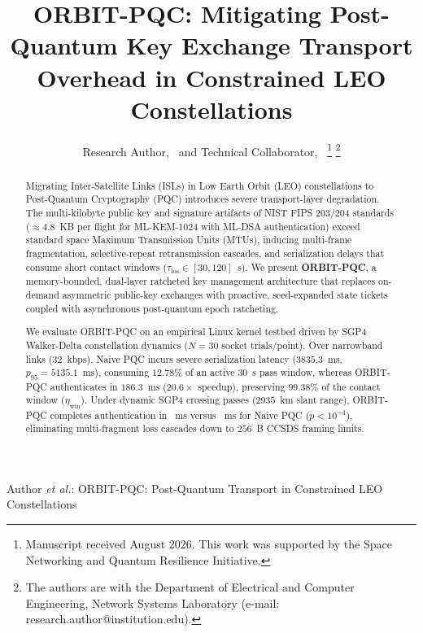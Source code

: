 \documentclass[lettersize,journal]{IEEEtran}
\begin{document}
\title{ORBIT-PQC: Mitigating Post-Quantum Key Exchange Transport Overhead in Constrained LEO Constellations}

\author{Research Author,~
        and Technical Collaborator,~%
\thanks{Manuscript received August 2026. This work was supported by the Space Networking and Quantum Resilience Initiative.}%
\thanks{The authors are with the Department of Electrical and Computer Engineering, Network Systems Laboratory (e-mail: research.author@institution.edu).}}

%
{Author \MakeLowercase{\textit{et al.}}: ORBIT-PQC: Post-Quantum Transport in Constrained LEO Constellations}

\maketitle

\begin{abstract}
Migrating Inter-Satellite Links (ISLs) in Low Earth Orbit (LEO) constellations to Post-Quantum Cryptography (PQC) introduces severe transport-layer degradation. The multi-kilobyte public key and signature artifacts of NIST FIPS 203/204 standards ($\approx 4.8$~KB per flight for ML-KEM-1024 with ML-DSA authentication) exceed standard space Maximum Transmission Units (MTUs), inducing multi-frame fragmentation, selective-repeat retransmission cascades, and serialization delays that consume short contact windows ($\tau_{\text{los}} \in [30, 120]$~s). We present \textbf{ORBIT-PQC}, a memory-bounded, dual-layer ratcheted key management architecture that replaces on-demand asymmetric public-key exchanges with proactive, seed-expanded state tickets coupled with asynchronous post-quantum epoch ratcheting.

We evaluate ORBIT-PQC on an empirical Linux kernel testbed driven by SGP4 Walker-Delta constellation dynamics ($N=30$ socket trials/point). Over narrowband links ($32$~kbps), Naive PQC incurs severe serialization latency ($3835.3$~ms, $p_{95} = 5135.1$~ms), consuming $12.78\%$ of an active $30$~s pass window, whereas ORBIT-PQC authenticates in $186.3$~ms ($20.6\times$ speedup), preserving $99.38\%$ of the contact window ($\eta_{\text{win}}$). Under dynamic SGP4 crossing passes ($2935$~km slant range), ORBIT-PQC completes authentication in \OrbitMeanCrossingLatency~ms versus \NaiveMeanCrossingLatency~ms for Naive PQC ($p < 10^{-4}$), eliminating multi-fragment loss cascades down to $256$~B CCSDS framing limits.
\end{abstract}
\end{document}
